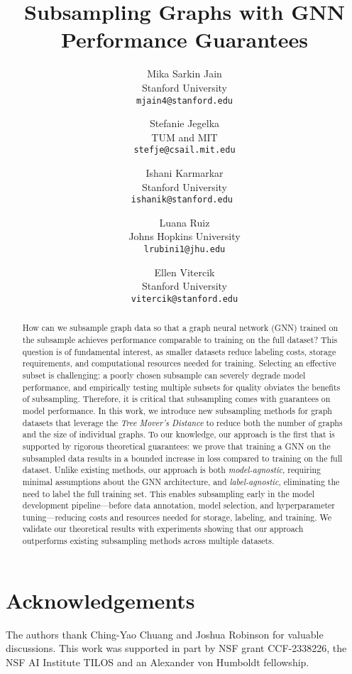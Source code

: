 \documentclass[11pt]{article}
\title{Subsampling Graphs with GNN Performance Guarantees}
\author{
	Mika Sarkin Jain \\ Stanford University \\ \texttt{mjain4@stanford.edu} \and 
	Stefanie Jegelka \\ TUM and MIT \\ \texttt{stefje@csail.mit.edu}
    \and
	Ishani Karmarkar \\ Stanford University \\ \texttt{ishanik@stanford.edu }
  \and
  	Luana Ruiz \\ Johns Hopkins University \\ \texttt{lrubini1@jhu.edu}
    \and
	Ellen Vitercik \\ Stanford University \\ \texttt{vitercik@stanford.edu}}
\begin{document}
\maketitle

\begin{abstract}
How can we subsample graph data so that a graph neural network (GNN) trained on the subsample achieves performance comparable to training on the full dataset? This question is of fundamental interest, as smaller datasets reduce labeling costs, storage requirements, and computational resources needed for training. Selecting an effective subset is challenging: a poorly chosen subsample can severely degrade model performance, and empirically testing multiple subsets for quality obviates the benefits of subsampling. Therefore, it is critical that subsampling comes with guarantees on model performance. In this work, we introduce new subsampling methods for graph datasets that leverage the \emph{Tree Mover’s Distance} to reduce both the number of graphs and the size of individual graphs. To our knowledge, our approach is the first that is supported by rigorous theoretical guarantees: we prove that training a GNN on the subsampled data results in a bounded increase in loss compared to training on the full dataset. Unlike existing methods, our approach is both \emph{model-agnostic}, requiring minimal assumptions about the GNN architecture, and \emph{label-agnostic}, eliminating the need to label the full training set. This enables subsampling early in the model development pipeline—before data annotation, model selection, and hyperparameter tuning—reducing costs and resources needed for storage, labeling, and training. We validate our theoretical results with experiments showing that our approach outperforms existing subsampling methods across multiple datasets.
 \end{abstract}









\section*{Acknowledgements}
The authors thank Ching-Yao Chuang and Joshua Robinson for valuable discussions.  This work was supported in part by NSF grant CCF-2338226, the NSF AI Institute TILOS and an Alexander von Humboldt fellowship.







\newpage
\appendix



\end{document}
